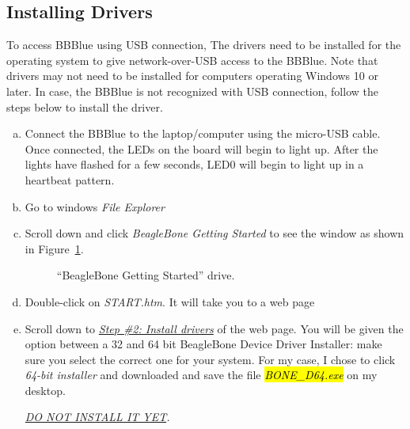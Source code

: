 \subsection{Installing Drivers}
\label{sec:drivers}

To access BBBlue using USB connection,  
The drivers need to be installed for the operating system to give
network-over-USB access to the BBBlue. Note that drivers may not need to be
installed for computers operating Windows 10 or later. In case, the BBBlue is
not recognized with USB connection, follow the steps below to install the
driver. 

\begin{enumerate}[a)]
\item  Connect the BBBlue to the laptop/computer using the micro-USB cable. Once connected, the LEDs on the board will begin to light up. After the lights have flashed for a few seconds, LED0 will begin to light up in a heartbeat pattern. 

\item Go to windows \emph{File Explorer}
  
\item Scroll down and  click \emph{BeagleBone Getting Started} to see the window as shown in Figure~\ref{fig:BBBlue-Start}. %
\begin{figure}
    \centering
    \caption{``BeagleBone Getting Started'' drive.}
    \label{fig:BBBlue-Start}
\end{figure}
%
\item Double-click on \emph{START.htm}.  It will take you to a web page %
\item Scroll down to \emph{\underline{Step \#2: Install drivers}} of the web page.  You will be given the option between a 32 and 64 bit BeagleBone Device Driver Installer: make sure you select the correct one for your system. For my case, I chose to click \emph{64-bit installer} and downloaded  and save the file \hl{\emph{BONE\_D64.exe}} on my desktop. 
  
  \emph{\uppercase{\underline{do not install it yet}}.}

\end{enumerate}

